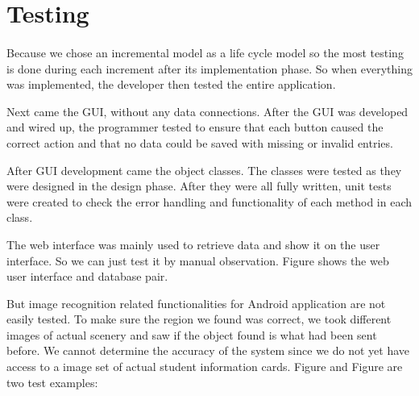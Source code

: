 \section{Testing}												
\label{sec:Testing}
\paragraph{} Because we chose an incremental model as a life cycle model so the most testing is done during each increment after its implementation phase. So when everything was implemented, the developer then tested the entire application.
\par Next came the GUI, without any data connections. After the GUI was developed and wired up, the programmer tested to ensure that each button caused the correct action and that no data could be saved with missing or invalid entries.

\par After GUI development came the object classes. The classes were tested as they were designed in the design phase. After they were all fully written, unit tests were created to check the error handling and functionality of each method in each class.

\par The web interface was mainly used to retrieve data and show it on the user interface. So we can just test it by manual observation. Figure shows the web user interface and database pair.

\par But image recognition related functionalities for Android application are not easily tested. To make sure the region we found was correct, we took different images of actual scenery and saw if the object found is what had been sent before. We cannot determine the accuracy of the system since we do not yet have access to a image set of actual student information cards. Figure and Figure are two test examples: 

